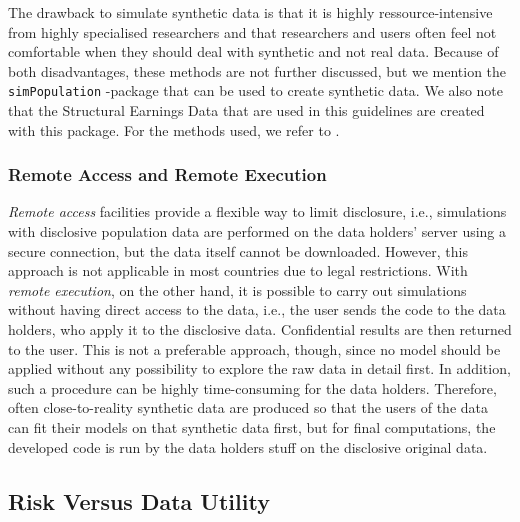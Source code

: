 \documentclass[12pt]{article}
\begin{document}
The drawback to simulate synthetic data is that it is highly ressource-intensive from highly 
specialised researchers and
that researchers and users often feel not comfortable when they should deal with synthetic and
not real data. Because of both disadvantages, these methods are not further discussed, but we
mention the \texttt{simPopulation} \citep{simPopulation} \R -package that can be used to create synthetic data. 
We also note that the Structural Earnings Data that are used in this guidelines are created with
this package. For the methods used, we refer to \cite{alfons11b}.


\subsubsection{Remote Access and Remote Execution}

\emph{Remote access} facilities provide a flexible way to limit disclosure,
i.e., simulations with disclosive population data are performed on the data
holders' server using a secure connection, but the data itself cannot be
downloaded. However, this approach is not applicable in most countries due to
legal restrictions. With \emph{remote execution}, on the other hand, it is possible
to carry out simulations without having direct access to the data, i.e., the
user sends the code to the data holders, who apply it to the disclosive data.
Confidential results are then returned to the user. This is not a preferable
approach, though, since no model should be applied without any possibility to
explore the raw data in detail first. In addition, such a procedure can be
highly time-consuming for the data holders. Therefore, often close-to-reality synthetic data
are produced so that the users of the data can fit their models on that synthetic data first, but
for final computations, the developed code is run by the data holders stuff on the disclosive 
original data.




\subsection{Risk Versus Data Utility}
\end{document}

